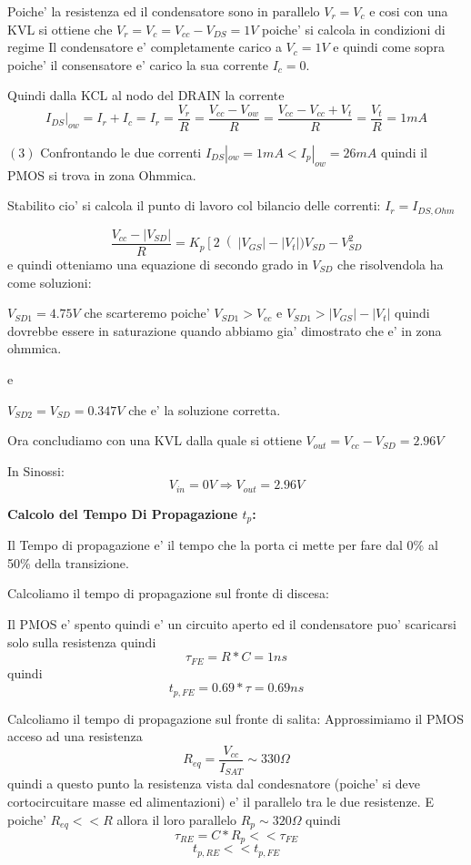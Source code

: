 \documentclass[\main/main.tex]{subfiles}
\begin{document}
Poiche' la resistenza ed il condensatore sono in parallelo $V_r = V_c$ e cosi con una KVL si ottiene che $V_r = V_c = V_{cc} - V_{DS} = 1V$ poiche' si calcola in condizioni di regime Il condensatore e' completamente carico a $V_c = 1V$  e quindi come sopra poiche' il consensatore e' carico la sua corrente $I_c = 0$.

Quindi dalla KCL al nodo del DRAIN la corrente \[I_{DS}|_{ow} = I_r + I_c = I_r = \frac{V_r}{R}= \frac{ V_{cc} - V_{ow}}{R} =  \frac{ V_{cc} - V_{cc} + V_t}{R} = \frac{V_t}{R} = 1mA\]

$(3)$ Confrontando le due correnti $I_{DS}|_{ow} = 1mA < I_p |_{ow} = 26mA$ quindi il PMOS si trova in zona Ohmmica.


Stabilito cio' si calcola il punto di lavoro col bilancio delle correnti:
$I_r = I_{DS,Ohm}$

\[\frac{V_{cc} - |V_{SD}|}{R} = K_p \left[ 2 \right(|V_{GS}| - |V_t|)V_{SD} - V_{SD}^2\]
e quindi otteniamo una equazione di secondo grado in $V_{SD}$ che risolvendola ha come soluzioni:

$V_{SD1} = 4.75V$ che scarteremo poiche' $V_{SD1} > V_{cc}$ e $V_{SD1} > |V_{GS}| - |V_t|$ quindi dovrebbe essere in saturazione quando abbiamo gia' dimostrato che e' in zona ohmmica.

e

$V_{SD2} = V_{SD} = 0.347V$ che e' la soluzione corretta.

Ora concludiamo con una KVL dalla quale si ottiene $V_{out} = V_{cc} - V_{SD} = 2.96V$

In Sinossi:
\[V_{in} = 0V \Rightarrow V_{out} = 2.96V\]

\textbf{Calcolo del Tempo Di Propagazione $t_p$:}

Il Tempo di propagazione e' il tempo che la porta ci mette per fare dal 0\% al 50\% della transizione.

Calcoliamo il tempo di propagazione sul fronte di discesa:

Il PMOS e' spento quindi e' un circuito aperto ed il condensatore puo' scaricarsi solo sulla resistenza quindi \[\tau_{FE} = R * C = 1ns\]
quindi \[t_{p,FE} = 0.69 * \tau = 0.69ns\]

Calcoliamo il tempo di propagazione sul fronte di salita:
Approssimiamo il PMOS acceso ad una resistenza
\[R_{eq} = \frac{V_{cc}}{I_{SAT}} \sim 330\Omega\]
quindi a questo punto la resistenza vista dal condesnatore (poiche' si deve cortocircuitare masse ed alimentazioni) e' il parallelo tra le due resistenze.
E poiche' $R_{eq} << R$ allora il loro parallelo $R_p \sim 320\Omega$
quindi \[\tau_{RE} = C * R_p << \tau_{FE}\]
\[t_{p,RE} << t_{p,FE}\]
\end{document}
